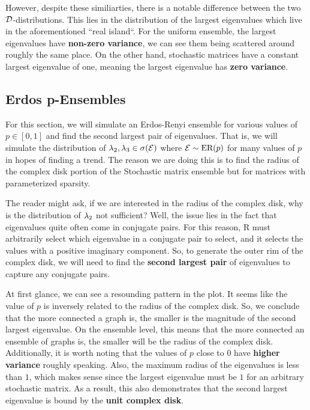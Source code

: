 However, despite these similiarties, there is a notable difference between the two $\mathcal{D}$-distributions. This lies in the distribution of the largest eigenvalues which live in the aforementioned ``real island``. For the uniform ensemble, the largest eigenvalues have \textbf{non-zero variance}, we can see them being scattered around roughly the same place. On the other hand, stochastic matrices have a constant largest eigenvalue of one, meaning the largest eigenvalue has \textbf{zero variance}.

\newpage

\subsection{Erdos p-Ensembles}

For this section, we will simulate an Erdos-Renyi ensemble for various values of $p \in [0,1]$ and find the second largest pair of eigenvalues.
That is, we will simulate the distribution of $\lambda_2,\lambda_3 \in \sigma(\mathcal{E})$ where $\mathcal{E} \sim \text{ER}(p)$ for many values of $p$ in hopes of finding a trend.
The reason we are doing this is to find the radius of the complex disk portion of the Stochastic matrix ensemble but for matrices with parameterized sparsity.

\begin{remark}
  The reader might ask, if we are interested in the radius of the complex disk, why is the distribution of $\lambda_2$ not sufficient? Well, the issue lies in the fact that eigenvalues quite often come in conjugate pairs. For this reason, R must arbitrarily select which eigenvalue in a conjugate pair to select, and it selects the values with a positive imaginary component. So, to generate the outer rim of the complex disk, we will need to find the \textbf{second largest pair} of eigenvalues to capture any conjugate pairs.
\end{remark}


At first glance, we can see a resounding pattern in the plot. It seems like the value of $p$ is inversely related to the radius of the complex disk. So, we conclude that the more connected a graph is, the smaller is the magnitude of the second largest eigenvalue. On the ensemble level, this means that the more connected an ensemble of graphs is, the smaller will be the radius of the complex disk. Additionally, it is worth noting that the values of $p$ close to $0$ have \textbf{higher variance} roughly speaking. Also, the maximum radius of the eigenvalues is less than $1$, which makes sense since the largest eigenvalue must be $1$ for an arbitrary stochastic matrix. As a result, this also demonstrates that the second largest eigenvalue is bound by the \textbf{unit complex disk}.

